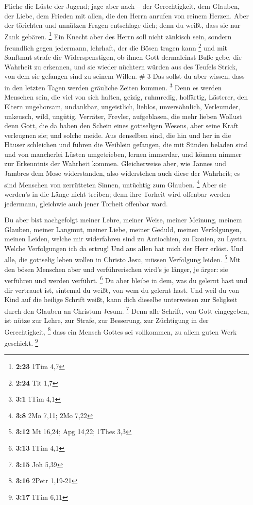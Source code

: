  Fliehe die Lüste der Jugend; jage aber nach -- der
Gerechtigkeit, dem Glauben, der Liebe, dem Frieden mit allen, die den
Herrn anrufen von reinem Herzen.  Aber der törichten und
unnützen Fragen entschlage dich; denn du weißt, dass sie nur Zank
gebären. \footnote{\textbf{2:23} 1Tim 4,7}  Ein Knecht
aber des Herrn soll nicht zänkisch sein, sondern freundlich gegen
jedermann, lehrhaft, der die Bösen tragen kann \footnote{\textbf{2:24}
  Tit 1,7}  und mit Sanftmut strafe die Widerspenstigen,
ob ihnen Gott dermaleinst Buße gebe, die Wahrheit zu erkennen,
 und sie wieder nüchtern würden aus des Teufels Strick,
von dem sie gefangen sind zu seinem Willen. \# 3  Das
sollst du aber wissen, dass in den letzten Tagen werden gräuliche Zeiten
kommen. \footnote{\textbf{3:1} 1Tim 4,1}  Denn es werden
Menschen sein, die viel von sich halten, geizig, ruhmredig, hoffärtig,
Lästerer, den Eltern ungehorsam, undankbar, ungeistlich, 
lieblos, unversöhnlich, Verleumder, unkeusch, wild, ungütig,
 Verräter, Frevler, aufgeblasen, die mehr lieben Wollust
denn Gott,  die da haben den Schein eines gottseligen
Wesens, aber seine Kraft verleugnen sie; und solche meide.
 Aus denselben sind, die hin und her in die Häuser
schleichen und führen die Weiblein gefangen, die mit Sünden beladen sind
und von mancherlei Lüsten umgetrieben,  lernen immerdar,
und können nimmer zur Erkenntnis der Wahrheit kommen. 
Gleicherweise aber, wie Jannes und Jambres dem Mose widerstanden, also
widerstehen auch diese der Wahrheit; es sind Menschen von zerrütteten
Sinnen, untüchtig zum Glauben. \footnote{\textbf{3:8} 2Mo 7,11; 2Mo 7,22}
 Aber sie werden's in die Länge nicht treiben; denn ihre
Torheit wird offenbar werden jedermann, gleichwie auch jener Torheit
offenbar ward.

 Du aber bist nachgefolgt meiner Lehre, meiner Weise,
meiner Meinung, meinem Glauben, meiner Langmut, meiner Liebe, meiner
Geduld,  meinen Verfolgungen, meinen Leiden, welche mir
widerfahren sind zu Antiochien, zu Ikonien, zu Lystra. Welche
Verfolgungen ich da ertrug! Und aus allen hat mich der Herr erlöst.
 Und alle, die gottselig leben wollen in Christo Jesu,
müssen Verfolgung leiden. \footnote{\textbf{3:12} Mt 16,24; Apg 14,22;
  1Thes 3,3}  Mit den bösen Menschen aber und
verführerischen wird's je länger, je ärger: sie verführen und werden
verführt. \footnote{\textbf{3:13} 1Tim 4,1}  Du aber
bleibe in dem, was du gelernt hast und dir vertrauet ist, sintemal du
weißt, von wem du gelernt hast.  Und weil du von Kind auf
die heilige Schrift weißt, kann dich dieselbe unterweisen zur Seligkeit
durch den Glauben an Christum Jesum. \footnote{\textbf{3:15} Joh 5,39}
 Denn alle Schrift, von Gott eingegeben, ist nütze zur
Lehre, zur Strafe, zur Besserung, zur Züchtigung in der Gerechtigkeit,
\footnote{\textbf{3:16} 2Petr 1,19-21}  dass ein Mensch
Gottes sei vollkommen, zu allem guten Werk geschickt. \footnote{\textbf{3:17}
  1Tim 6,11}

